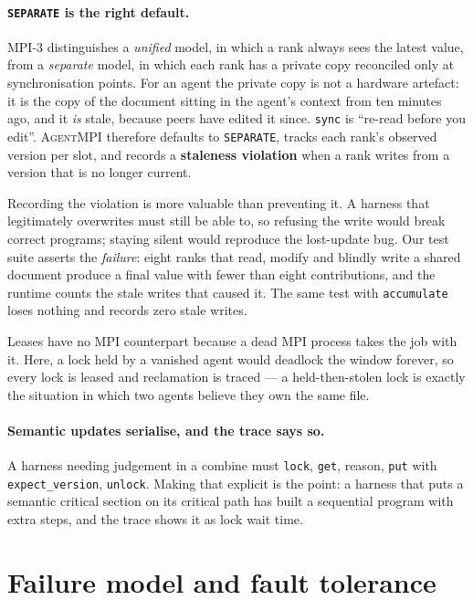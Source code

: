 \documentclass[10pt,twocolumn]{article}
\theoremstyle{definition}
\theoremstyle{plain}
\newcommand{\ampi}{\textsc{AgentMPI}}
\newcommand{\code}[1]{\texttt{\small #1}}
\begin{document}
\paragraph{\code{SEPARATE} is the right default.} MPI-3 distinguishes a
\emph{unified} model, in which a rank always sees the latest value, from a
\emph{separate} model, in which each rank has a private copy reconciled only at
synchronisation points. For an agent the private copy is not a hardware artefact:
it is the copy of the document sitting in the agent's context from ten minutes ago,
and it \emph{is} stale, because peers have edited it since. \code{sync} is
``re-read before you edit''. \ampi{} therefore defaults to \code{SEPARATE}, tracks
each rank's observed version per slot, and records a \textbf{staleness violation}
when a rank writes from a version that is no longer current.

Recording the violation is more valuable than preventing it. A harness that
legitimately overwrites must still be able to, so refusing the write would break
correct programs; staying silent would reproduce the lost-update bug. Our test
suite asserts the \emph{failure}: eight ranks that read, modify and blindly write a
shared document produce a final value with fewer than eight contributions, and the
runtime counts the stale writes that caused it. The same test with
\code{accumulate} loses nothing and records zero stale writes.

Leases have no MPI counterpart because a dead MPI process takes the job with it.
Here, a lock held by a vanished agent would deadlock the window forever, so every
lock is leased and reclamation is traced --- a held-then-stolen lock is exactly the
situation in which two agents believe they own the same file.

\paragraph{Semantic updates serialise, and the trace says so.} A harness needing
judgement in a combine must \code{lock}, \code{get}, reason, \code{put} with
\code{expect\_version}, \code{unlock}. Making that explicit is the point: a harness
that puts a semantic critical section on its critical path has built a sequential
program with extra steps, and the trace shows it as lock wait time.

\section{Failure model and fault tolerance}
\label{sec:ft}
\end{document}
